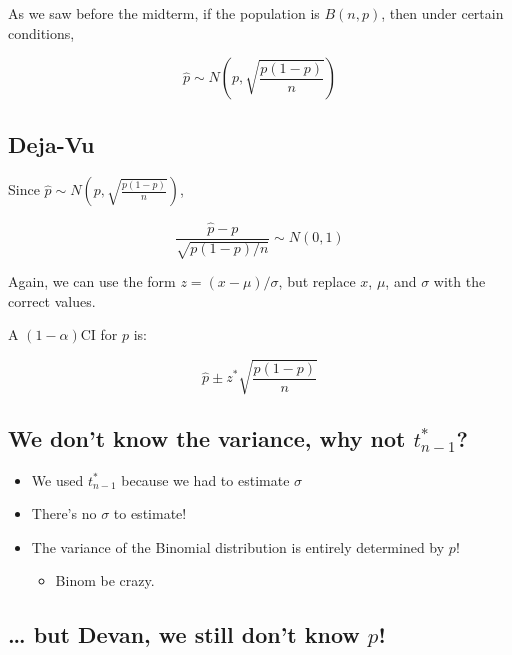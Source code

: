 \documentclass[
  letterpaper,
  DIV=11,
  numbers=noendperiod,
  oneside]{scrreprt}
\providecommand{\tightlist}{%
  \setlength{\itemsep}{0pt}\setlength{\parskip}{0pt}}\usepackage{longtable,booktabs,array}
\begin{document}
As we saw before the midterm, if the population is \(B(n,p)\), then
under certain conditions,

\[\hat p \sim N\left(p, \sqrt{\frac{p(1-p)}{n}}\right)\]

\hypertarget{deja-vu}{%
\subsection{Deja-Vu}\label{deja-vu}}

Since \(\hat p \sim N(p, \sqrt{\frac{p(1-p)}{n}})\),

\[
\frac{\hat p - p}{\sqrt{p(1-p)/n}} \sim N(0,1)
\]

\pause Again, we can use the form \(z = (x-\mu)/\sigma\), but replace
\(x\), \(\mu\), and \(\sigma\) with the correct values.\pause

A \((1-\alpha)\)CI for \(p\) is:

\[
\hat p \pm z^*\sqrt{\frac{p(1-p)}{n}}
\]

\hypertarget{we-dont-know-the-variance-why-not-t_n-1}{%
\subsection{\texorpdfstring{We don't know the variance, why not
\(t_{n-1}^*\)?}{We don't know the variance, why not t\_\{n-1\}\^{}*?}}\label{we-dont-know-the-variance-why-not-t_n-1}}

\begin{itemize}
\item
  We used \(t_{n-1}^*\) because we had to estimate \(\sigma\)\newline
\item
  There's no \(\sigma\) to estimate!\newline
\item
  The variance of the Binomial distribution is entirely determined by
  \(p\)!

  \begin{itemize}
  \tightlist
  \item
    Binom be crazy.
  \end{itemize}
\end{itemize}

\hypertarget{but-devan-we-still-dont-know-p}{%
\subsection{\texorpdfstring{\ldots{} but Devan, we still don't know
\(p\)!}{\ldots{} but Devan, we still don't know p!}}\label{but-devan-we-still-dont-know-p}}
\end{document}
